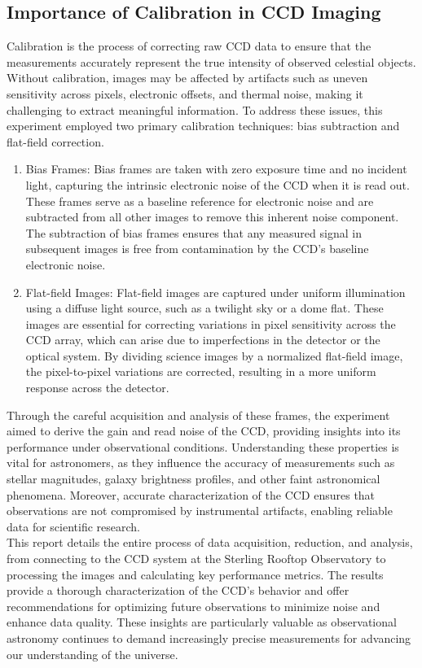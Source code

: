 \documentclass[linenumbers,twocolumn]{aastex631}
\begin{document}
\subsection{Importance of Calibration in CCD Imaging}

Calibration is the process of correcting raw CCD data to ensure that the measurements accurately represent the true intensity of observed celestial objects. Without calibration, images may be affected by artifacts such as uneven sensitivity across pixels, electronic offsets, and thermal noise, making it challenging to extract meaningful information. To address these issues, this experiment employed two primary calibration techniques: bias subtraction and flat-field correction.
\begin{enumerate}
    \item Bias Frames: Bias frames are taken with zero exposure time and no incident light, capturing the intrinsic electronic noise of the CCD when it is read out. These frames serve as a baseline reference for electronic noise and are subtracted from all other images to remove this inherent noise component. The subtraction of bias frames ensures that any measured signal in subsequent images is free from contamination by the CCD's baseline electronic noise.
    \item Flat-field Images: Flat-field images are captured under uniform illumination using a diffuse light source, such as a twilight sky or a dome flat. These images are essential for correcting variations in pixel sensitivity across the CCD array, which can arise due to imperfections in the detector or the optical system. By dividing science images by a normalized flat-field image, the pixel-to-pixel variations are corrected, resulting in a more uniform response across the detector.
\end{enumerate}

Through the careful acquisition and analysis of these frames, the experiment aimed to derive the gain and read noise of the CCD, providing insights into its performance under observational conditions. Understanding these properties is vital for astronomers, as they influence the accuracy of measurements such as stellar magnitudes, galaxy brightness profiles, and other faint astronomical phenomena. Moreover, accurate characterization of the CCD ensures that observations are not compromised by instrumental artifacts, enabling reliable data for scientific research. \\

This report details the entire process of data acquisition, reduction, and analysis, from connecting to the CCD system at the Sterling Rooftop Observatory to processing the images and calculating key performance metrics. The results provide a thorough characterization of the CCD's behavior and offer recommendations for optimizing future observations to minimize noise and enhance data quality. These insights are particularly valuable as observational astronomy continues to demand increasingly precise measurements for advancing our understanding of the universe.
\end{document}
